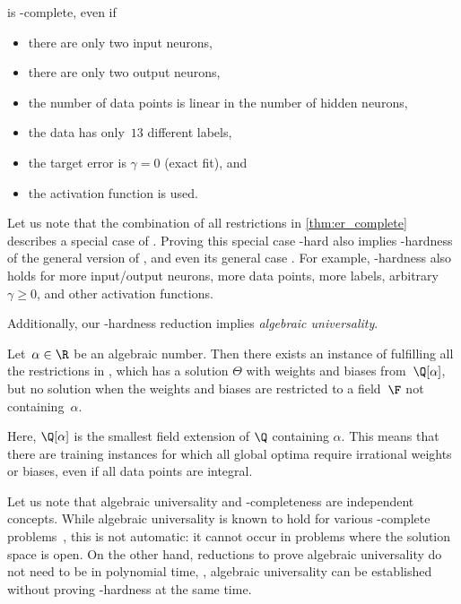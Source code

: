 \documentclass{toc}
\begin{document}
\begin{theorem}
    \label{thm:er_complete}
    \trainNN is \ER-complete, even if
    \begin{itemize}[nosep]
        \item there are only two input neurons,
        \item there are only two output neurons,
        \item the number of data points is linear in the number of hidden neurons,
        \item the data has only~$13$ different labels,
        \item the target error is $\gamma=0$ 
        (exact fit),
        and
        \item the \ReLU activation function is used.
    \end{itemize}
\end{theorem}

Let us note that the combination of all restrictions in \cref{thm:er_complete} describes a special case of \trainNN.
Proving this special case \ER-hard also implies \ER-hardness of the general version of \trainNN, and even its general case \ERM.
For example, \ER-hardness also holds for more input/output neurons, more data points, more labels, arbitrary~$\gamma \geq 0$, and other activation functions.

Additionally, our \ER-hardness reduction implies \emph{algebraic universality}.

\begin{theorem}
    \label{thm:universality}
    Let~$\alpha \in \R$ be an algebraic number.
    Then there exists an instance of \trainNN fulfilling all the restrictions in , which has a %
solution $\Theta$
with weights and biases %
%
from~$\Q[\alpha]$, but no solution when the weights and biases %
are restricted to a field~$\F$ not containing~$\alpha$.
\end{theorem}

Here, $\Q[\alpha]$ is the smallest field extension of $\Q$ containing $\alpha$. 
This means that there are training instances for which all global optima require irrational weights or biases, even if all data points are integral.

Let us note that algebraic universality and \ER-completeness are independent 
concepts. %
While algebraic universality is known to hold for various \ER-complete 
problems~\cite{Abrahamsen2019_Toolbox}, this is not %
automatic: it  %
cannot occur in problems where the solution space is open.
On the other hand, reductions to prove algebraic universality do not need to be in polynomial
time, \ie, algebraic universality can be established without proving \ER-hardness at the
same time.
\end{document}
